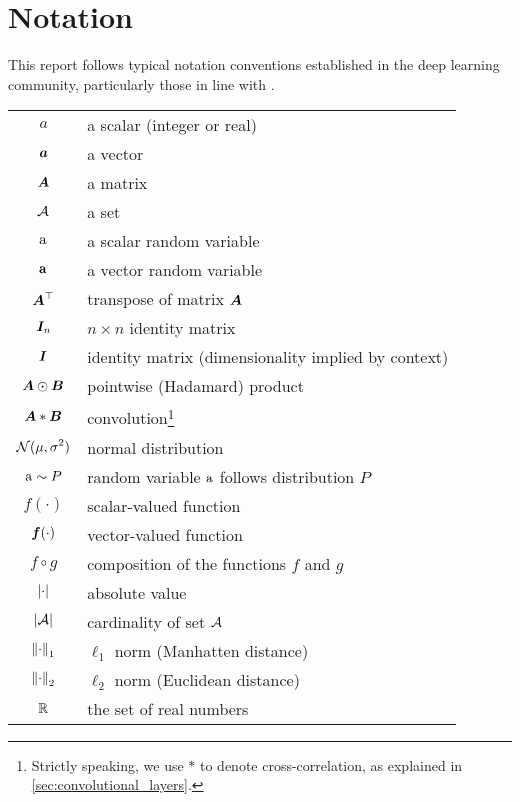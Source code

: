 \documentclass[../main.tex]{subfiles}
\begin{document}
\chapter*{Notation}

This report follows typical notation conventions established in the deep learning community, particularly those in line with \textcite{goodfellow2016}.

\bigskip
\noindent
\begin{tabular}{cl}
    $\displaystyle a$ & a scalar (integer or real)\\
    $\displaystyle {\bm{a}}$ & a vector\\
    $\displaystyle {\bm{A}}$ & a matrix\\
    $\displaystyle {\mathcal{A}}$ & a set\\
    $\displaystyle {\textnormal{a}}$ & a scalar random variable\\
    $\displaystyle {\mathbf{a}}$ & a vector random variable\\
    $\displaystyle {\bm{A}}^\top$ & transpose of matrix ${\bm{A}}$\\
    $\displaystyle {\bm{I}}_n$ & $n \times n$ identity matrix\\
    $\displaystyle {\bm{I}}$ & identity matrix (dimensionality implied by context)\\
    $\displaystyle {\bm{A}} \odot {\bm{B}}$ & pointwise (Hadamard) product\\
    $\displaystyle {\bm{A}} * {\bm{B}}$ & convolution\footnote{Strictly speaking, we use $*$ to denote cross-correlation, as explained in \cref{sec:convolutional_layers}.}\\
    $\displaystyle \mathcal{N}(\mu,\sigma^2)$ & normal distribution\\
    $\displaystyle {\textnormal{a}} \sim P$ & random variable ${\textnormal{a}}$ follows distribution $P$\\
    $\displaystyle f(\cdot)$ & scalar-valued function\\
    $\displaystyle {\bm{f}}(\cdot)$ & vector-valued function\\
    $\displaystyle f \circ g$ & composition of the functions $f$ and $g$\\
    $\displaystyle \lvert\cdot\rvert$ & absolute value\\
    $\displaystyle \lvert{\mathcal{A}}\rvert$ & cardinality of set ${\mathcal{A}}$\\
    $\displaystyle \left\lVert\cdot\right\rVert_1$ & $\ell_1$ norm (Manhatten distance)\\
    $\displaystyle \left\lVert\cdot\right\rVert_2$ & $\ell_2$ norm (Euclidean distance)\\
    $\displaystyle \mathbb{R}$ & the set of real numbers\\

\end{tabular}
\end{document}
